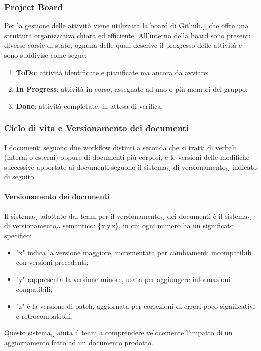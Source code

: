 \documentclass[10pt]{article}
\begin{document}
\begin{justify}
    \subsubsection{Project Board}
    Per la gestione delle attività viene utilizzata la board di Github$_G$, che offre una struttura organizzativa chiara ed efficiente. All'interno della board sono presenti diverse corsie di stato, ognuna delle quali descrive il progresso delle attività e sono suddivise come segue:
    \begin{enumerate}
        \item \textbf{ToDo}: attività identificate e pianificate ma ancora da avviare;
        \item \textbf{In Progress}: attività in corso, assegnate ad uno o più membri del gruppo;
        \item \textbf{Done}: attività completate, in attesa di verifica.
    \end{enumerate}

    \subsubsection{Ciclo di vita e Versionamento dei documenti}
    I documenti seguono due workflow distinti a seconda che si tratti di verbali (interni o esterni) oppure di documenti più corposi, e le versioni delle modifiche successive apportate ai documenti seguono il sistema$_G$ di versionamento$_G$ indicato di seguito.\\

        \paragraph{Versionamento dei documenti}
        Il sistema$_G$ adottato dal team per il versionamento$_G$ dei documenti è il sistema$_G$ di versionamento$_G$ semantico: \{x.y.z\}, in cui ogni numero ha un significato specifico:\\
        \begin{itemize}
            \item "x" indica la versione maggiore, incrementata per cambiamenti incompatibili con versioni precedenti;
            \item "y" rappresenta la versione minore, usata per aggiungere informazioni compatibili;
            \item "z" è la versione di patch, aggiornata per correzioni di errori poco significativi e retrocompatibili.
        \end{itemize}
        Questo sistema$_G$ aiuta il team a comprendere velocemente l'impatto di un aggiornamento fatto ad un documento prodotto.\\


\end{justify}
\end{document}
